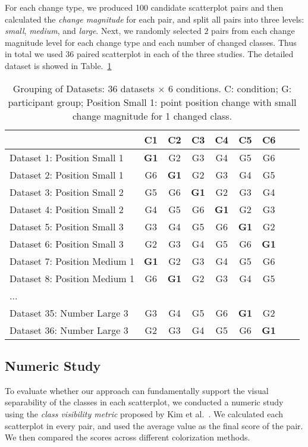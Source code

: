 For each change type, we produced 100 candidate scatterplot pairs and then calculated the \emph{change magnitude} for each pair, and split all  pairs into three levels: \emph{small},  \emph{medium}, and \emph{large}.
Next, we randomly selected $2$ pairs from each change magnitude level for each change type and each number of changed classes. Thus in total we used $36$ paired scatterplot in each of the three studies. The detailed dataset is showed in Table.~\ref{tab:latinsquare}

\begin{table}[ht]
     \renewcommand\arraystretch{1}
     \centering
     \caption{Grouping of Datasets: $36$ datasets $\times$ $6$ conditions. C: condition; G: participant group; Position Small 1: point position change with small change magnitude for 1 changed class.}
     \label{tab:latinsquare}
     \begin{tabular}{lcccccccc}
     \hline
      & C1 & C2 & C3  & C4 & C5 & C6 \\
     
     \hline
     Dataset 1: Position Small 1 & \textbf{G1} & G2 & G3  & G4 & G5 & G6 \\
     Dataset 2: Position Small 1 & G6 & \textbf{G1} & G2 & G3  & G4 & G5 \\
     Dataset 3: Position Small 2 & G5  & G6 & \textbf{G1} & G2 & G3 & G4 \\
     Dataset 4: Position Small 2 & G4 & G5  & G6 & \textbf{G1} & G2 & G3 \\
     Dataset 5: Position Small 3 & G3 & G4 & G5  & G6 & \textbf{G1} & G2 \\
     Dataset 6: Position Small 3 & G2 & G3 & G4  & G5 & G6 & \textbf{G1} \\
     Dataset 7: Position Medium 1 & \textbf{G1} & G2 & G3  & G4 & G5 & G6 \\
     Dataset 8: Position Medium 1 & G6 & \textbf{G1} & G2 & G3  & G4 & G5 \\
     ... & & & & & & &\\
     Dataset 35: Number Large 3 & G3 & G4 & G5  & G6 & \textbf{G1} & G2 \\
     Dataset 36: Number Large 3 & G2 & G3  & G4 & G5 & G6 & \textbf{G1}  \\
     
     \hline
     \end{tabular}
     \end{table}

\subsection{Numeric Study}
\label{subsec:quantitystudy}
To evaluate whether our approach can fundamentally support the visual separability of the classes in each scatterplot, we conducted a numeric study using the \emph{class visibility metric} proposed by Kim et al.~\cite{lee2013perceptually}. We calculated each scatterplot in every pair, and used the average value as the final score of the pair. We then compared the scores across different colorization methods.

